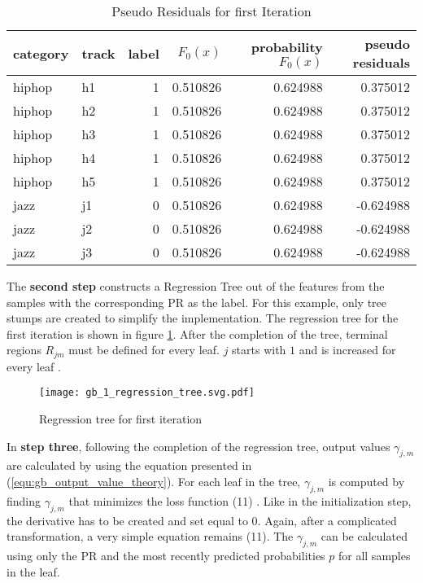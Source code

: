 \begin{table}[H]
    \centering
    \begin{tabular}{llrrrr}
        \toprule
        category & track &  label & \(F_{0}(x)\) &  probability \(F_{0}(x)\) &  pseudo residuals \\
        \midrule
          hiphop &    h1 &      1 & 0.510826 &         0.624988 &            0.375012 \\
          hiphop &    h2 &      1 & 0.510826 &         0.624988 &            0.375012 \\
          hiphop &    h3 &      1 & 0.510826 &         0.624988 &            0.375012 \\
          hiphop &    h4 &      1 & 0.510826 &         0.624988 &            0.375012 \\
          hiphop &    h5 &      1 & 0.510826 &         0.624988 &            0.375012 \\
            jazz &    j1 &      0 & 0.510826 &         0.624988 &           -0.624988 \\
            jazz &    j2 &      0 & 0.510826 &         0.624988 &           -0.624988 \\
            jazz &    j3 &      0 & 0.510826 &         0.624988 &           -0.624988 \\
        \bottomrule
        \end{tabular} 
    \caption{Pseudo Residuals for first Iteration}%
    \label{tbl:theory_pseudo_residuals_1_iteration}%
  \end{table} 

The \textbf{second step} constructs a Regression Tree out of the features from the samples with the corresponding 
PR as the label. For this example, only tree stumps are created to simplify the implementation. 
The regression tree for the first iteration is shown in figure \ref{fig:gb_1_regression_tree}. After the completion of the 
tree, terminal regions \(R_{jm}\) must be defined for every leaf. \(j\) starts with \(1\) and is increased for 
every leaf \cite[p. 1195]{Friedman_2001}. 

\begin{figure}[H]
    \centering
    \caption[]{Regression tree for first iteration}
	\label{fig:gb_1_regression_tree}
    \texttt{[image: gb\_1\_regression\_tree.svg.pdf]}
\end{figure}

In \textbf{step three}, following the completion of the regression tree, output values \(\gamma_{j, m}\) are calculated by using 
the equation presented in (\ref{equ:gb_output_value_theory}). For each leaf in the tree, \(\gamma_{j, m}\) is computed by finding 
\(\gamma_{j, m}\) that minimizes the loss function (11) \cite[p. 361]{Hastie_2009}. Like in the initialization step, the derivative has 
to be created and set equal to \(0\). Again, after a complicated transformation, a very simple 
equation remains (11). The \(\gamma_{j, m}\)  can be calculated using only the \ac{PR} and the most 
recently predicted probabilities \(p\) for all samples in the leaf. 

